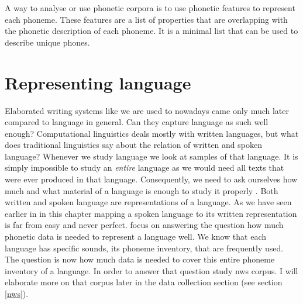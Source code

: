 A way to analyse or use phonetic corpora is to use phonetic features to represent each phoneme. These features are a list of properties that are overlapping with the phonetic description of each phoneme. It is a minimal list that can be used to describe unique phones. 

\section{Representing language}

Elaborated writing systems like we are used to nowadays came only much later compared to language in general. Can they capture language as such well enough? Computational linguistics deals mostly with written languages, but what does traditional linguistics say about the relation of written and spoken language? Whenever we study language we look at samples of that language. It is simply impossible to study an \textit{entire} language as we would need all texts that were ever produced in that language. Consequently, we need to ask ourselves how much and what material of a language is enough to study it properly \citep{baird_evans_greenhill_2021}. Both written and spoken language are representations of a language. As we have seen earlier in in this chapter mapping a spoken language to its written representation is far from easy and never perfect. \citet{baird_evans_greenhill_2021} focus on answering the question how much phonetic data is needed to represent a language well. We know that each language has specific sounds, its phoneme inventory, that are frequently used. The question is now how much data is needed to cover this entire phoneme inventory of a language. In order to answer that question \citet{baird_evans_greenhill_2021} study \ac{nws} corpus. I will elaborate more on that corpus later in the data collection section (see section \ref{nws}).


